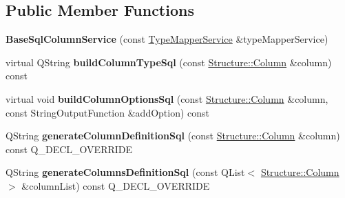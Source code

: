 \subsection*{Public Member Functions}
\begin{DoxyCompactItemize}
\item 
\mbox{\label{class_q_sql_migrator_1_1_helper_1_1_base_sql_column_service_a2a7e948e520d3da4eaf308d2574675f7}} 
{\bfseries Base\+Sql\+Column\+Service} (const \hyperlink{class_q_sql_migrator_1_1_helper_1_1_type_mapper_service}{Type\+Mapper\+Service} \&type\+Mapper\+Service)
\item 
\mbox{\label{class_q_sql_migrator_1_1_helper_1_1_base_sql_column_service_ac27cec78ddb481482c811ab5535b6da6}} 
virtual Q\+String {\bfseries build\+Column\+Type\+Sql} (const \hyperlink{class_q_sql_migrator_1_1_structure_1_1_column}{Structure\+::\+Column} \&column) const
\item 
\mbox{\label{class_q_sql_migrator_1_1_helper_1_1_base_sql_column_service_ac4654897bbc706f81e458e4e134ae36d}} 
virtual void {\bfseries build\+Column\+Options\+Sql} (const \hyperlink{class_q_sql_migrator_1_1_structure_1_1_column}{Structure\+::\+Column} \&column, const String\+Output\+Function \&add\+Option) const
\item 
\mbox{\label{class_q_sql_migrator_1_1_helper_1_1_base_sql_column_service_a46b338ad94cebfb2b408ec0a5977eedb}} 
Q\+String {\bfseries generate\+Column\+Definition\+Sql} (const \hyperlink{class_q_sql_migrator_1_1_structure_1_1_column}{Structure\+::\+Column} \&column) const Q\+\_\+\+D\+E\+C\+L\+\_\+\+O\+V\+E\+R\+R\+I\+DE
\item 
\mbox{\label{class_q_sql_migrator_1_1_helper_1_1_base_sql_column_service_a1df2e7645c44a6a80d8aab242d55ceac}} 
Q\+String {\bfseries generate\+Columns\+Definition\+Sql} (const Q\+List$<$ \hyperlink{class_q_sql_migrator_1_1_structure_1_1_column}{Structure\+::\+Column} $>$ \&column\+List) const Q\+\_\+\+D\+E\+C\+L\+\_\+\+O\+V\+E\+R\+R\+I\+DE
\item 
\mbox{\label{class_q_sql_migrator_1_1_helper_1_1_base_sql_column_service_acf93e8a83e2e23b8ccd83de0ea83bfdb}} 

\end{DoxyCompactItemize}
